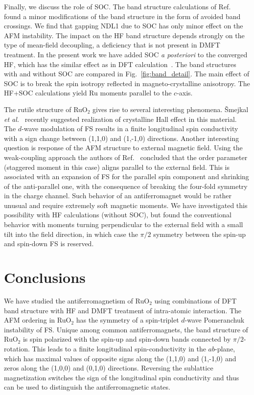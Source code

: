\documentclass[reprint,twocolumn,superscriptaddress,secnumarabic,amssymb, nobibnotes, aps, prb]{revtex4-1}
\begin{document}
Finally, we discuss the role of SOC. The band structure calculations of Ref.~ found a minor modifications of the band structure in the form of avoided band crossings. We find that gapping NDL1 due to SOC has only minor effect on the AFM instability. The impact on the HF band structure depends strongly on the type of mean-field decoupling, a deficiency that is not present in DMFT treatment. 
In the present work we have added SOC
{\it a posteriori} to the converged HF, which has the similar effect as in DFT calculation~\cite{Jovic2018}. The band structures  with and without SOC are compared in Fig.~\ref{fig:band_detail}. The main effect of SOC is to break the spin isotropy reflected in magneto-crystalline anisotropy. The HF+SOC calculations yield Ru moments parallel to the $c$-axis.

The rutile structure of RuO$_2$ gives rise to several interesting phenomena. \v{S}mejkal {\it et al.}~\cite{Smejkal2019} recently suggested realization of crystalline Hall effect in this material. The $d$-wave modulation of FS results in a finite longitudinal spin conductivity with a sign change between (1,1,0) and (1,-1,0) directions. Another interesting question is response of the AFM structure to external magnetic field. Using the weak-coupling approach the authors of Ref.~
concluded that the order parameter (staggered moment in this case) aligns parallel to the external field. This is associated with an expansion of FS for the parallel spin component and shrinking of the anti-parallel one, with the consequence of breaking the four-fold symmetry in the charge channel.
Such behavior of an antiferromagnet would be rather unusual and require extremely
soft magnetic moments. We have investigated this possibility with HF calculations (without SOC), but found the conventional behavior with moments turning perpendicular to the external field with a small tilt into the field direction, in which case the $\pi/2$ symmetry between the spin-up and spin-down FS
is reserved.

\section{Conclusions}
We have studied the antiferromagnetism of RuO$_2$ using combinations
of DFT band structure with HF and DMFT treatment of intra-atomic interaction.
The AFM ordering in RuO$_2$ has the symmetry of a spin-triplet $d$-wave Pomeranchuk instability of FS. Unique
among common antiferromagnets, the band structure of RuO$_2$ is spin polarized with
the spin-up and spin-down bands connected by $\pi/2$-rotation.
This leads to a finite longitudinal spin-conductivity in the $ab$-plane, which has maximal values
of opposite signs along the (1,1,0) and (1,-1,0) and zeros along the (1,0,0) and (0,1,0) directions.
Reversing the sublattice magnetization switches the sign of the longitudinal spin conductivity and thus can be used to distinguish the antiferromagnetic states.
\end{document}
